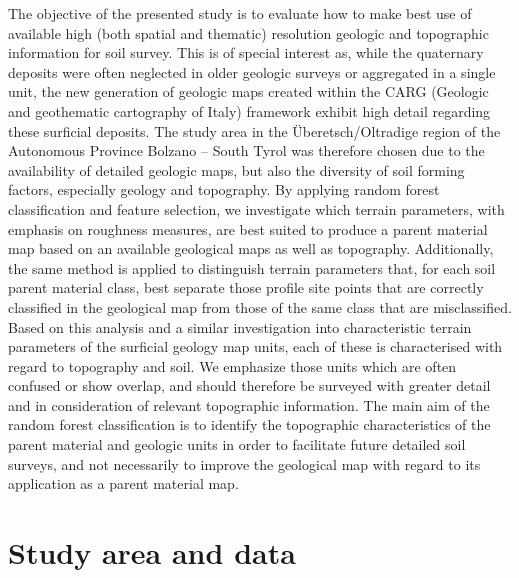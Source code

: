 \documentclass[preprint,12pt,authoryear]{elsarticle}
\begin{document}
The objective of the presented study is to evaluate how to make best use of available high (both spatial and thematic) resolution geologic and topographic information for soil survey. This is of special interest as, while the quaternary deposits were often neglected in older geologic surveys or aggregated in a single unit, the new generation of geologic maps created within the CARG (Geologic and geothematic cartography of Italy) framework  exhibit high detail regarding these surficial deposits.  The study area in the \"{U}beretsch/Oltradige region of the Autonomous Province Bolzano -- South Tyrol was therefore chosen due to the availability of detailed geologic maps, but also the diversity of soil forming factors, especially geology and topography. By applying random forest classification and feature selection, we investigate which terrain parameters, with emphasis on roughness measures, are best suited to produce a parent material map based on an available geological maps as well as topography. Additionally, the same method is applied to distinguish terrain parameters that, for each soil parent material class, best separate those profile site points that are correctly classified in the geological map from those of the same class that are misclassified. Based on this analysis and a similar investigation into characteristic terrain parameters of the surficial geology map units, each of these is characterised with regard to topography and soil. We emphasize those units which are often confused or show overlap, and should therefore be surveyed with greater detail and in consideration of relevant topographic information.
The main aim of the random forest classification is to identify the topographic characteristics of the parent material and geologic units in order to facilitate future detailed soil surveys, and not necessarily to improve the geological map with regard to its application as a parent material map.

\section{Study area and data}
\end{document}
